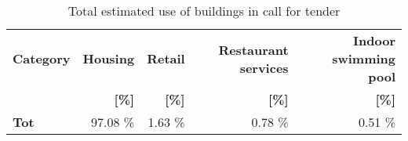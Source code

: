 \begin{table}[h!]
\centering
\caption{Total estimated use of buildings in call for tender}\vspace{2mm}
\label{tab:ppa_buildinguse_tot}
\begin{tabular}{lrrrr}
\toprule
\textbf{Category} & \textbf{Housing} & \textbf{Retail} & \textbf{Restaurant services} & \textbf{Indoor swimming pool} \\
                  & \textbf{[\%]}               & \textbf{[\%]}      & \textbf{[\%]}          & \textbf{[\%]}              \\
                  \midrule
\textbf{Tot}	  & 97.08 \%					& 1.63 \%			& 0.78 \%					& 0.51 \%					\\
\bottomrule
\end{tabular}
\end{table}